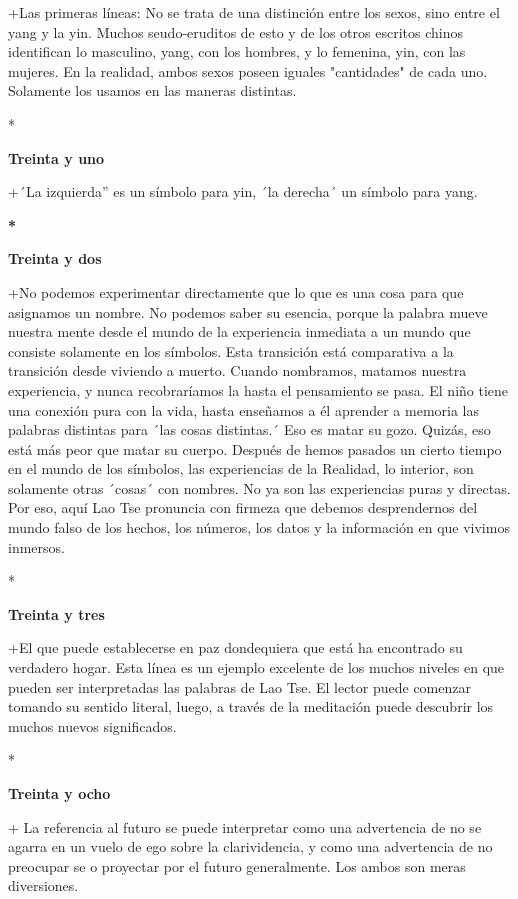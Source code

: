 +Las primeras líneas: No se trata de una distinción entre los sexos,
sino entre el yang y la yin. Muchos seudo-eruditos de esto y de los
otros escritos chinos identifican lo masculino, yang, con los hombres, y
lo femenina, yin, con las mujeres. En la realidad, ambos sexos poseen
iguales "cantidades" de cada uno. Solamente los usamos en las maneras
distintas.

*

\textbf{Treinta y uno}

+´La izquierda'' es un símbolo para yin, ´la derecha´ un símbolo para
yang.

\textbf{*}

\textbf{Treinta y dos}

+No podemos experimentar directamente que lo que es una cosa para que
asignamos un nombre. No podemos saber su esencia, porque la palabra
mueve nuestra mente desde el mundo de la experiencia inmediata a un
mundo que consiste solamente en los símbolos. Esta transición está
comparativa a la transición desde viviendo a muerto. Cuando nombramos,
matamos nuestra experiencia, y nunca recobraríamos la hasta el
pensamiento se pasa. El niño tiene una conexión pura con la vida, hasta
enseñamos a él aprender a memoria las palabras distintas para ´las cosas
distintas.´ Eso es matar su gozo. Quizás, eso está más peor que matar su
cuerpo. Después de hemos pasados un cierto tiempo en el mundo de los
símbolos, las experiencias de la Realidad, lo interior, son solamente
otras ´cosas´ con nombres. No ya son las experiencias puras y directas.
Por eso, aquí Lao Tse pronuncia con firmeza que debemos desprendernos
del mundo falso de los hechos, los números, los datos y la información
en que vivimos inmersos.

*

\textbf{Treinta y tres}

+El que puede establecerse en paz dondequiera que está ha encontrado su
verdadero hogar. Esta línea es un ejemplo excelente de los muchos
niveles en que pueden ser interpretadas las palabras de Lao Tse. El
lector puede comenzar tomando su sentido literal, luego, a través de la
meditación puede descubrir los muchos nuevos significados.

*

\textbf{Treinta y ocho}

+ La referencia al futuro se puede interpretar como una advertencia de
no se agarra en un vuelo de ego sobre la clarividencia, y como una
advertencia de no preocupar se o proyectar por el futuro generalmente.
Los ambos son meras diversiones.

